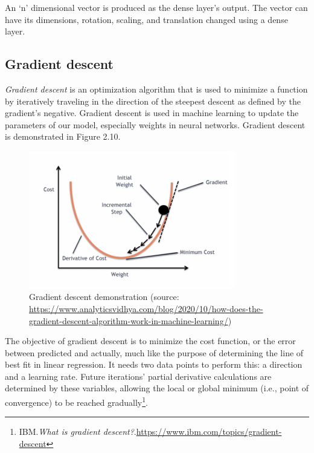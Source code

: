 An `n' dimensional vector is produced as the dense layer's output. The vector can have its dimensions, rotation, scaling, and translation changed using a dense layer. 

\subsection{Gradient descent}
\label{subsec:gradient_descent}
\hspace{0.5cm}\emph{Gradient descent} is an optimization algorithm that is used to minimize a function by iteratively traveling in the direction of the steepest descent as defined by the gradient's negative. Gradient descent is used in machine learning to update the parameters of our model, especially weights in neural networks. Gradient descent is demonstrated in Figure 2.10. \\ 
\begin{figure}[ht]
	\centering
	\includegraphics[width=\linewidth, height=6cm,keepaspectratio]{figures/gradient descent.png}
   \caption{Gradient descent demonstration (source: \url{https://www.analyticsvidhya.com/blog/2020/10/how-does-the-gradient-descent-algorithm-work-in-machine-learning/})}
\end{figure}

The objective of gradient descent is to minimize the cost function, or the error between predicted and actually, much like the purpose of determining the line of best fit in linear regression. It needs two data points to perform this: a direction and a learning rate. Future iterations' partial derivative calculations are determined by these variables, allowing the local or global minimum (i.e., point of convergence) to be reached gradually\footnote{IBM.\textit{What is gradient descent?}.\url{https://www.ibm.com/topics/gradient-descent}}.
